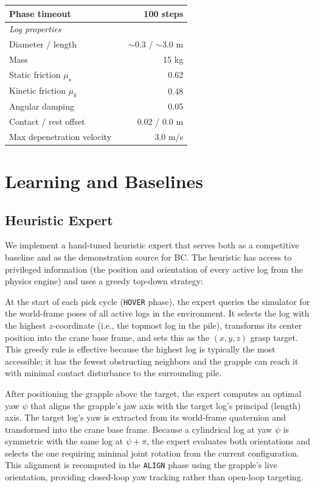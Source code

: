 \documentclass[conference]{IEEEtran}
\begin{document}
\begin{table}[t]
\begin{tabular}{llr}
Phase timeout & & 100 steps \\
\midrule
\multicolumn{3}{l}{\textit{Log properties}} \\
\midrule
Diameter / length & & $\sim$0.3 / $\sim$3.0 m \\
Mass & & 15 kg \\
Static friction $\mu_s$ & & 0.62 \\
Kinetic friction $\mu_k$ & & 0.48 \\
Angular damping & & 0.05 \\
Contact / rest offset & & 0.02 / 0.0 m \\
Max depenetration velocity & & 3.0 m/s \\
\bottomrule
\end{tabular}
\end{table}

\section{Learning and Baselines}

\subsection{Heuristic Expert}
\label{sec:expert}
We implement a hand-tuned heuristic expert that serves both as a competitive baseline and as the demonstration source for BC.
The heuristic has access to privileged information (the position and orientation of every active log from the physics engine) and uses a greedy top-down strategy:

At the start of each pick cycle (\texttt{HOVER} phase), the expert queries the simulator for the world-frame poses of all active logs in the environment.
It selects the log with the highest $z$-coordinate (i.e., the topmost log in the pile), transforms its center position into the crane base frame, and sets this as the $(x,y,z)$ grasp target.
This greedy rule is effective because the highest log is typically the most accessible; it has the fewest obstructing neighbors and the grapple can reach it with minimal contact disturbance to the surrounding pile.

After positioning the grapple above the target, the expert computes an optimal yaw $\psi$ that aligns the grapple's jaw axis with the target log's principal (length) axis.
The target log's yaw is extracted from its world-frame quaternion and transformed into the crane base frame.
Because a cylindrical log at yaw $\psi$ is symmetric with the same log at $\psi + \pi$, the expert evaluates both orientations and selects the one requiring minimal joint rotation from the current configuration.
This alignment is recomputed in the \texttt{ALIGN} phase using the grapple's live orientation, providing closed-loop yaw tracking rather than open-loop targeting.
\end{document}
